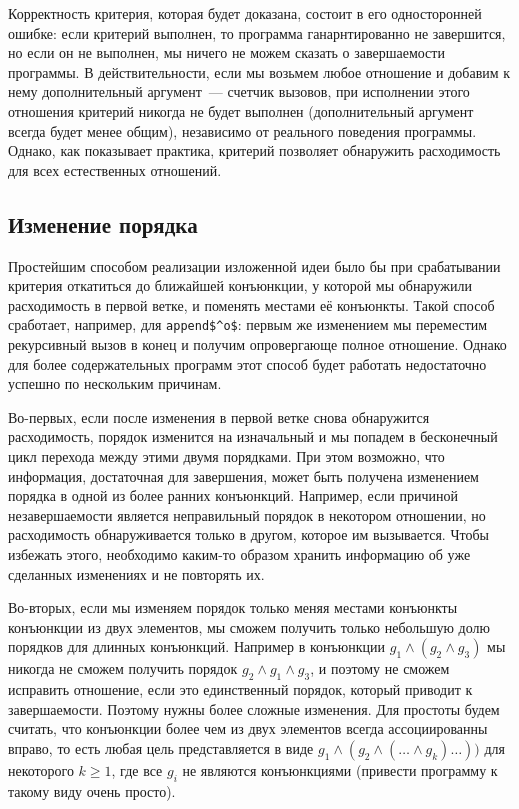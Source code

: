     Корректность критерия, которая будет доказана, состоит в его односторонней ошибке: если критерий выполнен, то программа ганарнтированно не завершится, но если он не выполнен, мы ничего не можем сказать о завершаемости программы. В действительности, если мы возьмем любое отношение и добавим к нему дополнительный аргумент~--- счетчик вызовов, при исполнении этого отношения критерий никогда не будет выполнен (дополнительный аргумент всегда будет менее общим), независимо от реального поведения программы. Однако, как показывает практика, критерий позволяет обнаружить расходимость для всех естественных отношений.
    
  \subsection{Изменение порядка}  
  
    Простейшим способом реализации изложенной идеи было бы при срабатывании критерия откатиться до ближайшей конъюнкции, у которой мы обнаружили расходимость в первой ветке, и поменять местами её конъюнкты. Такой способ сработает, например, для \lstinline|append$^o$|: первым же изменением мы переместим рекурсивный вызов в конец и получим опровергающе полное отношение. Однако для более содержательных программ этот способ будет работать недостаточно успешно по нескольким причинам.
  
    Во-первых, если после изменения в первой ветке снова обнаружится расходимость, порядок изменится на изначальный и мы попадем в бесконечный цикл перехода между этими двумя порядками. При этом возможно, что информация, достаточная для завершения, может быть получена изменением порядка в одной из более ранних конъюнкций. Например, если причиной незавершаемости является неправильный порядок в некотором отношении, но расходимость обнаруживается только в другом, которое им вызывается. Чтобы избежать этого, необходимо каким-то образом хранить информацию об уже сделанных изменениях и не повторять их.
  
    Во-вторых, если мы изменяем порядок только меняя местами конъюнкты конъюнкции из двух элементов, мы сможем получить только небольшую долю порядков для длинных конъюнкций. Например в конъюнкции $g_1 \wedge (g_2 \wedge g_3)$ мы никогда не сможем получить порядок $g_2 \wedge g_1 \wedge g_3$, и поэтому не сможем исправить отношение, если это единственный порядок, который приводит к завершаемости. Поэтому нужны более сложные изменения. Для простоты будем считать, что конъюнкции более чем из двух элементов всегда ассоциированны вправо, то есть любая цель представляется в виде $g_1 \wedge (g_2 \wedge ( \dots \wedge g_k) \dots ))$ для некоторого $k \ge 1$, где все $g_i$ не являются конъюнкциями (привести программу к такому виду очень просто).
  
